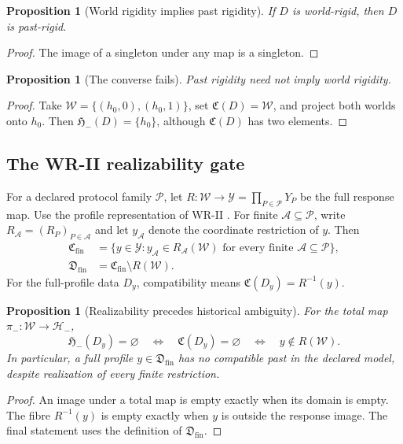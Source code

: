 \documentclass[11pt]{article}
\newtheorem{proposition}[definition]{Proposition}
\newcommand{\Wcal}{\mathcal W}
\newcommand{\Ccal}{\mathfrak C}
\newcommand{\Hminus}{\mathcal H_-}
\newcommand{\Pcal}{\mathfrak H_-}
\begin{document}
\begin{proposition}[World rigidity implies past rigidity]
\label{prop:world-past}
If $D$ is world-rigid, then $D$ is past-rigid.
\end{proposition}
\begin{proof}
The image of a singleton under any map is a singleton.
\end{proof}

\begin{proposition}[The converse fails]
\label{prop:converse}
Past rigidity need not imply world rigidity.
\end{proposition}
\begin{proof}
Take $\Wcal=\{(h_0,0),(h_0,1)\}$, set $\Ccal(D)=\Wcal$,
and project both worlds onto $h_0$. Then $\Pcal(D)=\{h_0\}$,
although $\Ccal(D)$ has two elements.
\end{proof}


\subsection{The WR-II realizability gate}

For a declared protocol family $\mathcal P$, let
$R:\Wcal\to\mathcal Y=\prod_{P\in\mathcal P}Y_P$ be the full
response map. Use the profile representation of WR-II
\cite[Sections 3--7]{WRII}. For finite $\mathcal A\subseteq\mathcal P$,
write $R_{\mathcal A}=(R_P)_{P\in\mathcal A}$ and let
$y_{\mathcal A}$ denote the coordinate restriction of $y$. Then
\[
\begin{aligned}
\mathfrak C_{\mathrm{fin}}
&=\{y\in\mathcal Y:y_{\mathcal A}\in R_{\mathcal A}(\Wcal)
  \text{ for every finite }\mathcal A\subseteq\mathcal P\},\\
\mathfrak D_{\mathrm{fin}}
&=\mathfrak C_{\mathrm{fin}}\setminus R(\Wcal).
\end{aligned}
\]
For the full-profile data $D_y$, compatibility means
$\Ccal(D_y)=R^{-1}(y)$.

\begin{proposition}[Realizability precedes historical ambiguity]
\label{prop:realizability-gate}
For the total map $\pi_-:\Wcal\to\Hminus$,
\[
\Pcal(D_y)=\varnothing
\quad\Longleftrightarrow\quad
\Ccal(D_y)=\varnothing
\quad\Longleftrightarrow\quad
y\notin R(\Wcal).
\]
In particular, a full profile $y\in\mathfrak D_{\mathrm{fin}}$
has no compatible past in the declared model, despite realization
of every finite restriction.
\end{proposition}
\begin{proof}
An image under a total map is empty exactly when its domain is
empty. The fibre $R^{-1}(y)$ is empty exactly when $y$ is outside
the response image. The final statement uses the definition of
$\mathfrak D_{\mathrm{fin}}$.
\end{proof}
\end{document}
